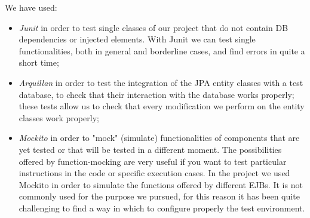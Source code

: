 We have used:
\begin{itemize}
\item \textit{Junit} in order to test single classes of our project that do not contain DB dependencies or injected elements. With Junit we can test single functionalities, both in general and borderline cases, and find errors in quite a short time;
\item \textit{Arquillan} in order to test the integration of the JPA entity classes with a test database, to check that their interaction with the database works properly; these tests allow us to check that every modification we perform on the entity classes work properly; 
\item \textit{Mockito} in order to "mock" (simulate) functionalities of components that are yet tested or that will be tested in a different moment. The possibilities offered by function-mocking are very useful if you want to test particular instructions in the code or specific execution cases. In the project we used Mockito in order to simulate the functions offered by different EJBs. It is not commonly used for the purpose we pursued, for this reason it has been quite challenging to find a way in which to configure properly the test environment. 
\end{itemize}
